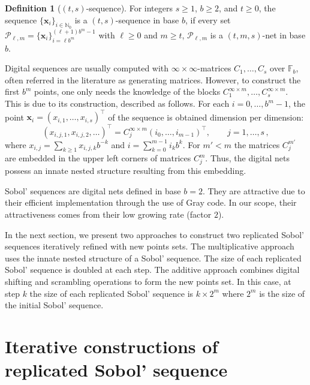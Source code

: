 \documentclass[]{elsarticle}
\theoremstyle{definition}
\newtheorem{defin}{Definition}
\newcommand{\bvec}[1]{\boldsymbol{#1}}
\newcommand{\vx}{\bvec{x}}
\begin{document}
\begin{defin}[$(t,s)$-sequence]
For integers $s\geq 1$, $b\geq 2$, and $t\geq 0$, the sequence $\{\vx_i\}_{i\in\mathbb{N}_0}$ is a $(t,s)$-sequence in base $b$, if every set $\mathcal{P}_{\ell,m}=\{\vx_i\}_{i=\ell b^m}^{(\ell+1)b^m-1}$ with $\ell\geq 0$ and $m\geq t$, $\mathcal{P}_{\ell,m}$ is a $(t,m,s)$-net in base $b$.
\end{defin}

Digital sequences are usually computed with $\infty\times\infty$-matrices $C_1,\dots,C_s$ over $\mathbb{F}_b$, often referred in the literature as generating matrices. However, to construct the first $b^m$ points, one only needs the knowledge of the blocks $C_1^{\infty\times m},\dots,C_s^{\infty\times m}$. This is due to its construction, described as follows. For each $i=0,\dots,b^m-1$, the point $\vx_i = (x_{i,1},\dots,x_{i,s})^\intercal$ of the sequence is obtained dimension per dimension:
\begin{equation}
\label{dig.net.eq.}
(x_{i,j,1},x_{i,j,2},\dots)^\intercal = C_j^{\infty\times m} (i_{0},\dots,i_{m-1})^\intercal,\qquad j= 1,\dots,s\, ,
\end{equation}
where $x_{i,j} = \sum_{k \geq 1}x_{i,j,k}b^{-k}$ and $i = \sum_{k=0}^{m-1}i_kb^{k}$. For $m' < m$ the matrices $C_j^{m'}$ are embedded in the upper left corners of matrices $C_j^{m}$. Thus, the digital nets possess an innate nested structure resulting from this embedding. %

Sobol' sequences are digital nets defined in base $b=2$. They are attractive due to their efficient implementation through the use of Gray code. In our scope, their attractiveness comes from their low growing rate (factor $2$). 
\bigskip

In the next section, we present two approaches to construct two replicated Sobol' sequences iteratively refined with new points sets. The multiplicative approach uses the innate nested structure of a Sobol' sequence. The size of each replicated Sobol' sequence is doubled at each step. The additive approach combines digital shifting and scrambling operations to form the new points set. In this case, at step $k$ the size of each replicated Sobol' sequence is $ k \times 2^m$ where $2^m$ is the size of the initial Sobol' sequence. 

\section{Iterative constructions of replicated Sobol' sequence}
\label{sobol.seq.cons}
\end{document}
